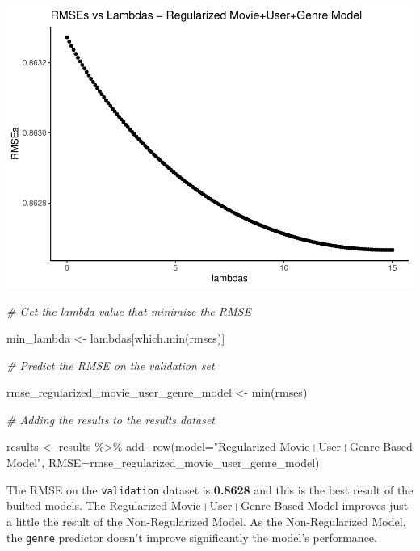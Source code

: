 \documentclass[
]{article}
\newenvironment{Shaded}{}{}
\newcommand{\AttributeTok}[1]{\textcolor[rgb]{0.49,0.56,0.16}{#1}}
\newcommand{\CommentTok}[1]{\textcolor[rgb]{0.38,0.63,0.69}{\textit{#1}}}
\newcommand{\FunctionTok}[1]{\textcolor[rgb]{0.02,0.16,0.49}{#1}}
\newcommand{\NormalTok}[1]{#1}
\newcommand{\OtherTok}[1]{\textcolor[rgb]{0.00,0.44,0.13}{#1}}
\newcommand{\SpecialCharTok}[1]{\textcolor[rgb]{0.25,0.44,0.63}{#1}}
\newcommand{\StringTok}[1]{\textcolor[rgb]{0.25,0.44,0.63}{#1}}
\begin{document}
\begin{center}\includegraphics{MovieLens-Project-Code_files/figure-latex/unnamed-chunk-42-1} \end{center}

\begin{Shaded}
\begin{Highlighting}[]
\CommentTok{\# Get the lambda value that minimize the RMSE}

\NormalTok{min\_lambda }\OtherTok{\textless{}{-}}\NormalTok{ lambdas[}\FunctionTok{which.min}\NormalTok{(rmses)]}

\CommentTok{\# Predict the RMSE on the validation set}

\NormalTok{rmse\_regularized\_movie\_user\_genre\_model }\OtherTok{\textless{}{-}} \FunctionTok{min}\NormalTok{(rmses)}

\CommentTok{\# Adding the results to the results dataset}

\NormalTok{results }\OtherTok{\textless{}{-}}\NormalTok{ results }\SpecialCharTok{\%\textgreater{}\%} \FunctionTok{add\_row}\NormalTok{(}\AttributeTok{model=}\StringTok{"Regularized Movie+User+Genre Based Model"}\NormalTok{, }\AttributeTok{RMSE=}\NormalTok{rmse\_regularized\_movie\_user\_genre\_model)}
\end{Highlighting}
\end{Shaded}

The RMSE on the \texttt{validation} dataset is \textbf{0.8628} and this
is the best result of the builted models. The Regularized
Movie+User+Genre Based Model improves just a little the result of the
Non-Regularized Model. As the Non-Regularized Model, the \texttt{genre}
predictor doesn't improve significantly the model's performance.
\end{document}
